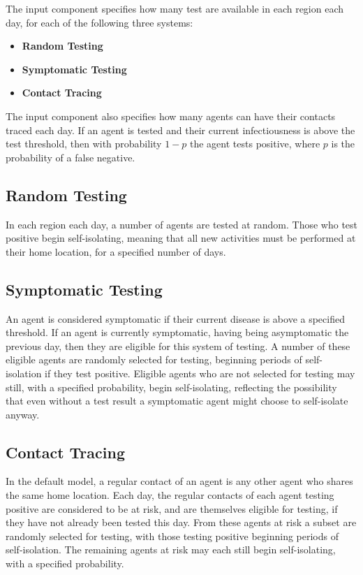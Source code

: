\documentclass[10pt,letterpaper]{article}
\begin{document}
The input component specifies how many test are available in each region each day, for each of the following three systems:
\begin{itemize}
\item \textbf{Random Testing}
\item \textbf{Symptomatic Testing}
\item \textbf{Contact Tracing}
\end{itemize}
The input component also specifies how many agents can have their contacts traced each day. If an agent is tested and their current infectiousness is above the test threshold, then with probability $ 1 - p $ the agent tests positive, where $p$ is the probability of a false negative.

\subsection{Random Testing}

In each region each day, a number of agents are tested at random. Those who test positive begin self-isolating, meaning that all new activities must be performed at their home location, for a specified number of days.

\subsection{Symptomatic Testing}

An agent is considered symptomatic if their current disease is above a specified threshold. If an agent is currently symptomatic, having being asymptomatic the previous day, then they are eligible for this system of testing. A number of these eligible agents are randomly selected for testing, beginning periods of self-isolation if they test positive. Eligible agents who are not selected for testing may still, with a specified probability, begin self-isolating, reflecting the possibility that even without a test result a symptomatic agent might choose to self-isolate anyway.

\subsection{Contact Tracing}

In the default model, a regular contact of an agent is any other agent who shares the same  home location. Each day, the regular contacts of each agent testing positive are considered to be at risk, and are themselves eligible for testing, if they have not already been tested this day. From these agents at risk a subset are randomly selected for testing, with those testing positive beginning periods of self-isolation. The remaining agents at risk may each still begin self-isolating, with a specified probability.
\end{document}
